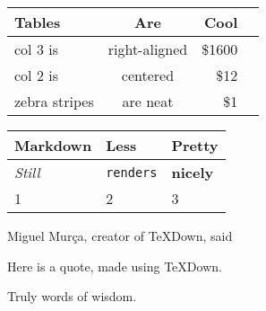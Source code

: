\documentclass{article}
\begin{document}
\vspace{5mm}


\begingroup
\setlength{\tabcolsep}{10pt}
\renewcommand{\arraystretch}{1.5}
\begin{tabular}{ |l|c|r|l| }
\hline
Tables & Are & Cool \\ \hline \hline
col 3 is & right-aligned & \$1600 \\ \hline
col 2 is & centered & \$12 \\ \hline
zebra stripes & are neat & \$1 \\ \hline
\end{tabular}
\endgroup

\vspace{5mm}


\begingroup
\setlength{\tabcolsep}{10pt}
\renewcommand{\arraystretch}{1.5}
\begin{tabular}{ |l|l|l| }
\hline
Markdown & Less & Pretty \\ \hline \hline
\emph{Still} & \lstinline[columns=fixed]$renders$ & \textbf{nicely} \\ \hline
1 & 2 & 3 \\ \hline
\end{tabular}
\endgroup

\vspace{5mm}

Miguel Murça, creator of TeXDown, said
\begin{displayquote}
Here is a quote,
made using TeXDown.
\end{displayquote}
Truly words of wisdom.
\end{document}
